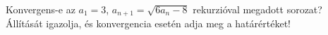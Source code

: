 \documentclass[11pt]{scrartcl}
\begin{document}
Konvergens-e az $a_1 = 3$, $a_{n + 1} = \sqrt{6a_n - 8}$ rekurzióval megadott
sorozat? Állítását igazolja, és konvergencia esetén adja meg a határértéket!
\end{document}
